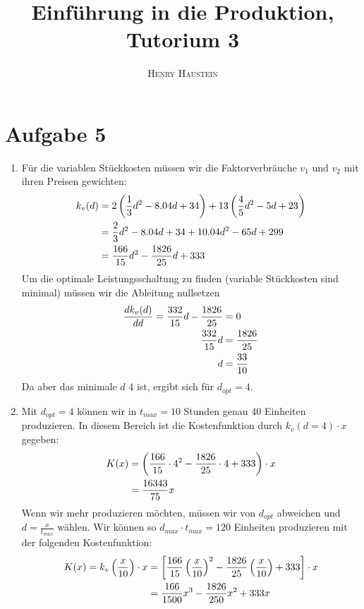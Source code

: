 \documentclass{article}
\title{\textbf{Einführung in die Produktion, Tutorium 3}}
\author{\textsc{Henry Haustein}}
\date{}
\begin{document}
	\maketitle
	
	\section*{Aufgabe 5}
	\begin{enumerate}[label=(\alph*)]
		\item Für die variablen Stückkosten müssen wir die Faktorverbräuche $v_1$ und $v_2$ mit ihren Preisen gewichten:
		\begin{align}
			k_v(d) &= 2\left(\frac{1}{3}d^2 - 8.04d + 34\right) + 13\left(\frac{4}{5}d^2 - 5d + 23\right) \notag \\
			&= \frac{2}{3}d^2 - 8.04d + 34 + 10.04d^2 - 65d + 299 \notag \\
			&= \frac{166}{15}d^2 - \frac{1826}{25}d + 333 \notag
		\end{align}
		Um die optimale Leistungsschaltung zu finden (variable Stückkosten sind minimal) müssen wir die Ableitung nullsetzen \begin{align}
			\frac{d k_v(d)}{d d} = \frac{332}{15}d - \frac{1826}{25} &= 0 \notag \\
			\frac{332}{15}d &= \frac{1826}{25} \notag \\
			d &= \frac{33}{10} \notag
		\end{align}
		Da aber das minimale $d$ 4 ist, ergibt sich für $d_{opt}=4$.
		\item Mit $d_{opt}=4$ können wir in $t_{max}=10$ Stunden genau 40 Einheiten produzieren. In diesem Bereich ist die Kostenfunktion durch $k_v(d=4)\cdot x$ gegeben:
		\begin{align}
			K(x) &= \left(\frac{166}{15}\cdot 4^2 - \frac{1826}{25}\cdot 4 + 333\right)\cdot x \notag \\
			&= \frac{16343}{75}x \notag
		\end{align}
		Wenn wir mehr produzieren möchten, müssen wir von $d_{opt}$ abweichen und $d=\frac{x}{t_{max}}$ wählen. Wir können so $d_{max}\cdot t_{max}=120$ Einheiten produzieren mit der folgenden Kostenfunktion:
		\begin{align}
			K(x) = k_v\left(\frac{x}{10}\right)\cdot x &= \left[\frac{166}{15}\left(\frac{x}{10}\right)^2 - \frac{1826}{25}\left(\frac{x}{10}\right) + 333\right]\cdot x \notag \\
			&= \frac{166}{1500}x^3 - \frac{1826}{250}x^2 + 333x \notag
		\end{align}

\end{enumerate}
\end{document}
